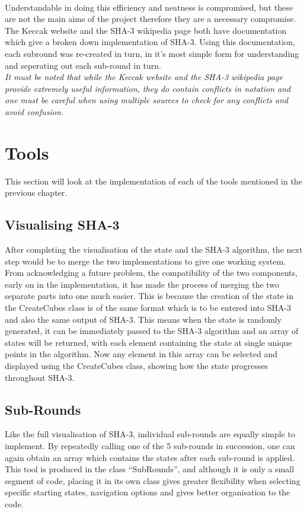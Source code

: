\vspace{5mm}\\
Understandable in doing this efficiency and neatness is compromised, but these are not the main aims of the project therefore they are a necessary compromise. 
\vspace{5mm}\\
The Keccak website\cite{KeccakSite} and the SHA-3 wikipedia page\cite{SHA3Wiki} both have documentation which give a broken down implementation of SHA-3. Using this documentation, each subround was re-created in turn, in it's most simple form for understanding and seperating out each sub-round in turn.
\vspace{0mm}\\
\textit{It must be noted that while the Keccak website and the SHA-3 wikipedia page provide extremely useful information, they do contain conflicts in notation and one must be careful when using multiple sources to check for any conflicts and avoid confusion.}
\section{Tools}
This section will look at the implementation of each of the tools mentioned in the previous chapter.
\subsection{Visualising SHA-3}
After completing the visualisation of the state and the SHA-3 algorithm, the next step would be to merge the two implementations to give one working system.
\vspace{5mm}\\
From acknowledging a future problem, the compatibility of the two components, early on in the implementation, it has made the process of merging the two separate parts into one much easier. This is because the creation of the state in the CreateCubes class is of the same format which is to be entered into SHA-3 and also the same output of SHA-3. This means when the state is randomly generated, it can be immediately passed to the SHA-3 algorithm and an array of states will be returned, with each element containing the state at single unique points in the algorithm. Now any element in this array can be selected and displayed using the CreateCubes class, showing how the state progresses throughout SHA-3.
\subsection{Sub-Rounds}
Like the full visualisation of SHA-3, individual sub-rounds are equally simple to implement. By repeatedly calling one of the 5 sub-rounds in succession, one can again obtain an array which contains the states after each sub-round is applied. 
\vspace{5mm}\\
This tool is produced in the class ``SubRounds'', and although it is only a small segment of code, placing it in its own class gives greater flexibility when selecting specific starting states, navigation options and gives better organisation to the code.
